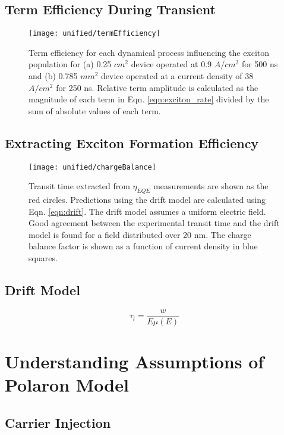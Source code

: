 \documentclass[../thesis.tex]{subfiles}
\begin{document}
\subsection{Term Efficiency During Transient}


\begin{wrapfigure}{r}{0.5\textwidth}
\centering
\texttt{[image: unified/termEfficiency]}
\caption{Term efficiency for each dynamical process influencing the exciton population for (a) 0.25 $cm^2$ device operated at 0.9 $A/cm^2$ for 500 ns and (b) 0.785 $mm^2$ device operated at a current density of 38 $A/cm^2$ for 250 ns. Relative term amplitude is calculated as the magnitude of each term in Eqn. \ref{eqn:exciton_rate} divided by the sum of absolute values of each term.}
\label{fig:termEfficiency}
\end{wrapfigure}
\subsection{Extracting Exciton Formation Efficiency}
\begin{wrapfigure}{r}{0.5\textwidth}
\centering
\texttt{[image: unified/chargeBalance]}
\caption{Transit time extracted from $\eta_{EQE}$ measurements are shown as the red circles. Predictions using the drift model are calculated using Eqn. \ref{eqn:drift}. The drift model assumes a uniform electric field. Good agreement between the experimental transit time and the drift model is found for a field distributed over 20 nm. The charge balance factor is shown as a function of current density in blue squares.}
\label{fig:chargeBalance}
\end{wrapfigure}
\subsection{Drift Model}

\begin{equation}
\tau_l=\frac{w}{E\mu(E)}
\label{eqn:drift}
\end{equation}


\section{Understanding Assumptions of Polaron Model}
\subsection{Carrier Injection}
\end{document}
